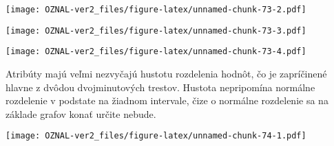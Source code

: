 \documentclass[
]{article}
\newenvironment{Shaded}{\begin{snugshade}}{\end{snugshade}}
\newcommand{\AttributeTok}[1]{\textcolor[rgb]{0.77,0.63,0.00}{#1}}
\newcommand{\ConstantTok}[1]{\textcolor[rgb]{0.00,0.00,0.00}{#1}}
\newcommand{\DecValTok}[1]{\textcolor[rgb]{0.00,0.00,0.81}{#1}}
\newcommand{\FloatTok}[1]{\textcolor[rgb]{0.00,0.00,0.81}{#1}}
\newcommand{\FunctionTok}[1]{\textcolor[rgb]{0.00,0.00,0.00}{#1}}
\newcommand{\NormalTok}[1]{#1}
\newcommand{\SpecialCharTok}[1]{\textcolor[rgb]{0.00,0.00,0.00}{#1}}
\newcommand{\StringTok}[1]{\textcolor[rgb]{0.31,0.60,0.02}{#1}}
\begin{document}
\texttt{[image: OZNAL-ver2\_files/figure-latex/unnamed-chunk-73-2.pdf]}

\begin{Shaded}
\end{Shaded}

\texttt{[image: OZNAL-ver2\_files/figure-latex/unnamed-chunk-73-3.pdf]}

\begin{Shaded}
\end{Shaded}

\texttt{[image: OZNAL-ver2\_files/figure-latex/unnamed-chunk-73-4.pdf]}

Atribúty majú veľmi nezvyčajú hustotu rozdelenia hodnôt, čo je
zapríčinené hlavne z dvôdou dvojminutových trestov. Hustota nepripomína
normálne rozdelenie v podstate na žiadnom intervale, čize o normálne
rozdelenie sa na základe grafov konať určite nebude.

\begin{Shaded}
\end{Shaded}

\texttt{[image: OZNAL-ver2\_files/figure-latex/unnamed-chunk-74-1.pdf]}

\begin{Shaded}
\end{Shaded}
\end{document}
